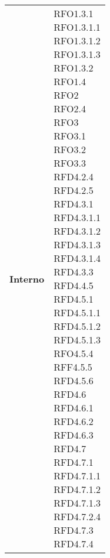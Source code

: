 \begin{longtable}[H]{| >{\centering\bfseries}p{8cm} | >{\centering\arraybackslash}p{8cm} |}
    Interno &
        \makecell{
            \rule{0pt}{4ex}
            RFO1.3.1 \\
            RFO1.3.1.1 \\
            RFO1.3.1.2 \\
            RFO1.3.1.3 \\
            RFO1.3.2 \\
            RFO1.4 \\
            RFO2 \\
            RFO2.4 \\
            RFO3 \\
            RFO3.1 \\
            RFO3.2 \\
            RFO3.3 \\
            RFD4.2.4 \\
            RFD4.2.5 \\
            RFD4.3.1 \\
            RFD4.3.1.1 \\
            RFD4.3.1.2 \\
            RFD4.3.1.3 \\
            RFD4.3.1.4 \\
            RFD4.3.3 \\
            RFD4.4.5 \\
            RFD4.5.1 \\
            RFD4.5.1.1 \\
            RFD4.5.1.2 \\
            RFD4.5.1.3 \\
            RFO4.5.4 \\
            RFF4.5.5 \\
            RFD4.5.6 \\
            RFD4.6 \\
            RFD4.6.1 \\
            RFD4.6.2 \\
            RFD4.6.3 \\
            RFD4.7 \\
            RFD4.7.1 \\
            RFD4.7.1.1\\
            RFD4.7.1.2 \\
            RFD4.7.1.3 \\
            RFD4.7.2.4 \\
            RFD4.7.3 \\
            RFD4.7.4 \\
}
\end{longtable}
